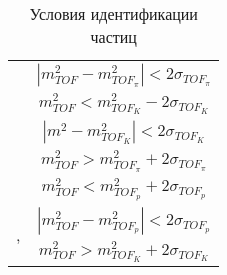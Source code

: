\begin{comment}
Диапазон поперечных импульсов разбивается на промежутки шириной 0.1 ГэВ/с, на каждом из которых сигналы заряженных адронов аппроксимируются функцией Гаусса. Пример такой аппроксимации в диапазоне поперечных импульсов 1.0-1.1 ГэВ/с представлен на рис. \ref{img:TOF_PID}. 
Далее зависимости от поперечного импульса полученных среднеквадратичных отклонений ($\Tilde{\sigma}_h$) и математических ожиданий ($\Tilde{m}^2_h$) функций Гаусса для адронов h (h=\pipm,\Kpm,\prot, \aprot ) аппроксимировались функцией  \ref{eq:TOFgaus_approx}.

\begin{equation}
	\label{eq:TOFgaus_approx}
	f(p_T) = P_0 +P_1/p_T + P_2/p_T^2 + P_3 \cdot exp(\sqrt{p_T}) +P_4 \cdot \sqrt{p_T} 
\end{equation}
где $P_i, i \in [1,4]$ - параметры аппроксимации.

Значения $\sigma_h$ и $m_h$, вычисленные по формуле \ref{eq:TOFgaus_approx}, использовались для идентификации частиц. Частица, с зарегистрированным квадратом массы $m^2$, идентифицируется как адрон h в том случае, если  $m^2$ удовлетворяет неравенствам $$ m^2_h -2\sigma_h < m^2 < m^2_h +2\sigma_h. $$
При значениях поперечных импульсов \pt~2-3 ГэВ/с происходит наложение сигналов заряженных адронов. В связи с этим было введено дополнительное условие, обеспечивающее непопадание массы частицы в диапазон $\pm 2\sigma_h$ соседних сигналов частиц.
Условия идентификации заряженных адронов приведены в таблице \ref{table:m2cuts}.
\end{comment}

\begin{table}[]
	\caption{Условия идентификации частиц}
	\label{table:m2cuts}
	\begin{center}
		\begin{tabular}{|c|c|}
			\hline
			\multirow{2}{*}{\pipm} & $|m^2_{TOF} - m^2_{TOF_{\pi}}|<2\sigma_{TOF_{\pi}}$ \\ 
			& $m^2_{TOF} < m^2_{TOF_{K}}-2\sigma_{TOF_{K}}$ \\ \hline
			\multirow{3}{*}{\Kpm}  & $|m^2 - m^2_{TOF_{K}}|<2\sigma_{TOF_{K}}$  \\ 
			& $m^2_{TOF} > m^2_{TOF_{\pi}}+2\sigma_{TOF_{\pi}}$\\  
			& $m^2_{TOF} < m^2_{TOF_{p}}+2\sigma_{TOF_{p}}$ \\ \hline
			\multirow{2}{*}{\prot, \aprot} & $|m^2_{TOF} - m^2_{TOF_{p}}|<2\sigma_{TOF_{p}}$ \\ 
			& $m^2_{TOF} > m^2_{TOF_{K}}+2\sigma_{TOF_{K}}$ \\ \hline
		\end{tabular}
	\end{center}
\end{table}



